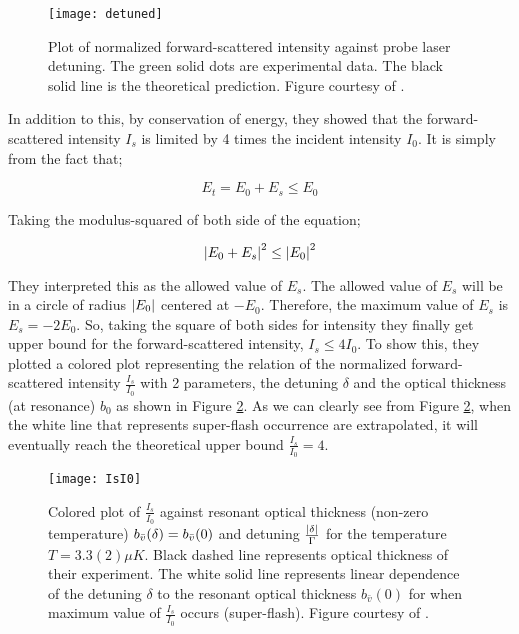 \begin{figure}[h!]
    \centering
    \texttt{[image: detuned]}
    \caption{Plot of normalized forward-scattered intensity against probe laser detuning. The green solid dots are experimental data. The black solid line is the theoretical prediction. Figure courtesy of \cite{Kwong2014}.}
    \label{fig: detuned}
\end{figure}

In addition to this, by conservation of energy, they showed that the forward-scattered intensity $I_{s}$ is limited by 4 times the incident intensity $I_{0}$. It is simply from the fact that;

\begin{equation}
    E_{t} = E_{0} + E_{s} \leq E_{0}
\end{equation}

Taking the modulus-squared of both side of the equation;

\begin{equation}
    \abs{E_{0} + E_{s}}^{2} \leq \abs{E_{0}}^{2}
\end{equation}

They interpreted this as the allowed value of $E_{s}$. The allowed value of $E_{s}$ will be in a circle of radius $\abs{E_{0}}$ centered at $-E_{0}$. Therefore, the maximum value of $E_{s}$ is $E_{s} = -2 E_{0}$. So, taking the square of both sides for intensity they finally get upper bound for the forward-scattered intensity, $I_{s} \leq 4 I_{0}$. To show this, they plotted a colored plot representing the relation of the normalized forward-scattered intensity $\frac{I_{s}}{I_{0}}$ with 2 parameters, the detuning $\delta$ and the optical thickness (at resonance) $b_{0}$ as shown in Figure \ref{fig: I_s/I_0}. As we can clearly see from Figure \ref{fig: I_s/I_0}, when the white line that represents super-flash occurrence are extrapolated, it will eventually reach the theoretical upper bound $\frac{I_{s}}{I_{0}} = 4$.

\begin{figure}[h!]
    \centering
    \texttt{[image: IsI0]}
    \caption{Colored plot of $\frac{I_{s}}{I_{0}}$  against resonant optical thickness (non-zero temperature) $b_{\bar{v}}(\delta) = b_{\Bar{v}}(0)$ and detuning $\frac{\abs{\delta}}{\Gamma}$ for the temperature $T = 3.3(2) \mu K$. Black dashed line represents optical thickness of their experiment. The white solid line represents linear dependence of the detuning $\delta$ to the resonant optical thickness $b_{\bar{v}}(0)$ for when maximum value of $\frac{I_{s}}{I_{0}}$ occurs (super-flash). Figure courtesy of \cite{Kwong2014}.}
    \label{fig: I_s/I_0}
\end{figure}

